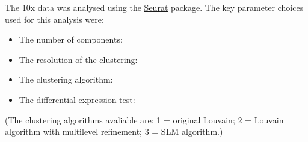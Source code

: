 The 10x data was analysed using the \href{http://satijalab.org/seurat/}{Seurat} package. The key parameter choices used for this analysis were:

\begin{itemize}
\item The number of \reductionType{} components: \nPCs
\item The resolution of the clustering: \resolution
\item The clustering algorithm: \clusteringAlgorithm
\item The differential expression test: \deTest
\end{itemize}

(The clustering algorithms avaliable are: 1 = original Louvain; 2 = Louvain algorithm with multilevel refinement; 3 = SLM algorithm.)


